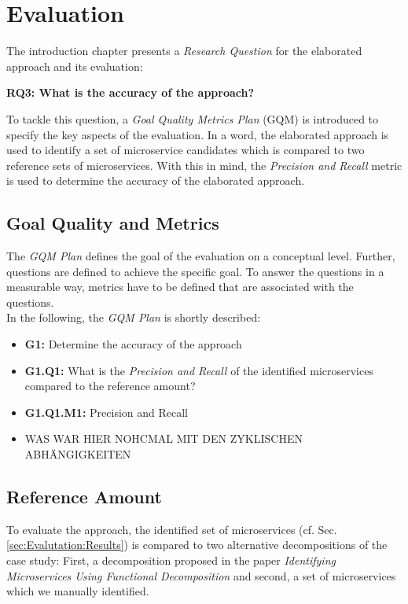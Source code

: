 \chapter{Evaluation}
\label{ch:Evalutation}
The introduction chapter presents a \textit{Research Question} for the elaborated approach and its evaluation:


\vspace{0.5cm}
\par
\begingroup
\leftskip=1cm
\rightskip=1cm

\noindent
\textbf{RQ3: What is the accuracy of the approach? }

\endgroup
\vspace{0.5cm}

\noindent
To tackle this question, a \textit{Goal Quality Metrics Plan } (GQM) is introduced to specify the key aspects of the evaluation. In a word, the elaborated approach is used to identify a set of microservice candidates which is compared to two reference sets of microservices. With this in mind, the \textit{Precision and Recall} metric is used to determine the accuracy of the elaborated approach.




\section{Goal Quality and Metrics}
\label{sec:Evaluation:GQM}
The \textit{GQM Plan} defines the goal of the evaluation on a conceptual level. Further, questions are defined to achieve the specific goal. To answer the questions in a measurable way, metrics have to be defined that are associated with the questions. \\
In the following, the \textit{GQM Plan} is shortly described:

\begin{itemize}
	\item \textbf{G1:} Determine the accuracy of the approach
	\item \textbf{G1.Q1:} What is the \textit{Precision and Recall} of the identified microservices compared to the reference amount?
	\item \textbf{G1.Q1.M1:}  Precision and Recall
	\item WAS WAR HIER NOHCMAL MIT DEN ZYKLISCHEN ABHÄNGIGKEITEN
\end{itemize}


\section{Reference Amount}
To evaluate the approach, the identified set of microservices (cf. Sec.\ref{sec:Evalutation:Results}) is compared to two alternative decompositions of the case study: First, a decomposition proposed in the paper \textit{Identifying Microservices Using Functional Decomposition} \cite{FunctionalDecompositionHeinrich} and second, a set of microservices which we manually identified. \\



